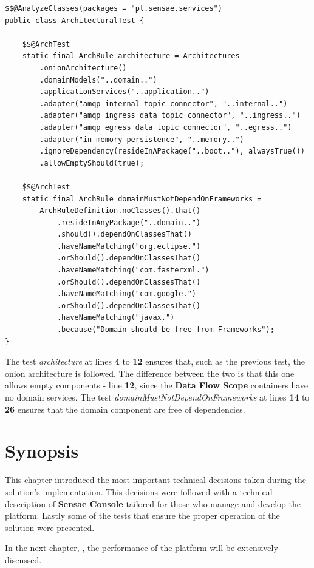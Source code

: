 \begin{lstlisting}[style=Java, caption=Architectural Test - Simplified Onion Architecture - \textbf{Data Processor Flow}, label={code:implementation:tests:arch2}]
$$@AnalyzeClasses(packages = "pt.sensae.services")
public class ArchitecturalTest {

    $$@ArchTest
    static final ArchRule architecture = Architectures
        .onionArchitecture()
        .domainModels("..domain..")
        .applicationServices("..application..")
        .adapter("amqp internal topic connector", "..internal..")
        .adapter("amqp ingress data topic connector", "..ingress..")
        .adapter("amqp egress data topic connector", "..egress..")
        .adapter("in memory persistence", "..memory..")
        .ignoreDependency(resideInAPackage("..boot.."), alwaysTrue())
        .allowEmptyShould(true);

    $$@ArchTest
    static final ArchRule domainMustNotDependOnFrameworks = 
        ArchRuleDefinition.noClasses().that()
            .resideInAnyPackage("..domain..")
            .should().dependOnClassesThat()
            .haveNameMatching("org.eclipse.")
            .orShould().dependOnClassesThat()
            .haveNameMatching("com.fasterxml.")
            .orShould().dependOnClassesThat()
            .haveNameMatching("com.google.")
            .orShould().dependOnClassesThat()
            .haveNameMatching("javax.")
            .because("Domain should be free from Frameworks");
}
\end{lstlisting}

The test \textit{architecture} at lines \textbf{4} to \textbf{12} ensures that, such as the previous test, the onion architecture is followed. The difference between the two is that this one allows empty components - line \textbf{12}, since the \textbf{Data Flow Scope} containers have no domain services. The test \textit{domainMustNotDependOnFrameworks} at lines \textbf{14} to \textbf{26} ensures that the domain component are free of dependencies.

\section{Synopsis}
\label{sec:implementation:synopsis}

This chapter introduced the most important technical decisions taken during the solution's implementation. This decisions were followed with a technical description of \textbf{Sensae Console} tailored for those who manage and develop the platform.
Lastly some of the tests that ensure the proper operation of the solution were presented.

In the next chapter, , the performance of the platform will be extensively discussed.
